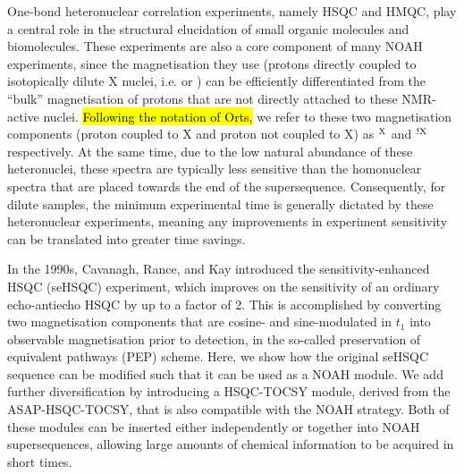 \documentclass[11pt]{article}
\newcommand*{\carbon}{\ce{^{13}C}}
\newcommand*{\nitrogen}{\ce{^{15}N}}
\newcommand*{\magn}[1]{\ce{^1H}$^{#1}$}
\newcommand*{\magnnot}[1]{\ce{^1H}$^{!#1}$}
\begin{document}
One-bond heteronuclear correlation experiments, namely HSQC and HMQC, play a central role in the structural elucidation of small organic molecules and biomolecules.\autocite{textbooks}
These experiments are also a core component of many NOAH experiments, since the magnetisation they use (protons directly coupled to isotopically dilute X nuclei, i.e. \carbon{} or \nitrogen{}) can be efficiently differentiated from the ``bulk'' magnetisation of protons that are not directly attached to these NMR-active nuclei.\autocite{Garbow1982CPL, Kupce2019JMR}
\hl{Following the notation of Orts,}\autocite{Orts2018M} we refer to these two magnetisation components (proton coupled to X and proton not coupled to X) as \magn{\ce{X}} and \magnnot{\ce{X}} respectively.
At the same time, due to the low natural abundance of these heteronuclei, these spectra are typically less sensitive than the homonuclear spectra that are placed towards the end of the supersequence.
Consequently, for dilute samples, the minimum experimental time is generally dictated by these heteronuclear experiments, meaning any improvements in experiment sensitivity can be translated into greater time savings.

In the 1990s, Cavanagh, Rance, and Kay introduced the sensitivity-enhanced HSQC (seHSQC) experiment, which improves on the sensitivity of an ordinary echo-antiecho HSQC by up to a factor of 2.\autocite{sehsqc}
This is accomplished by converting two magnetisation components that are cosine- and sine-modulated in $t_1$ into observable magnetisation prior to detection, in the so-called preservation of equivalent pathways (PEP) scheme.
Here, we show how the original seHSQC sequence can be modified such that it can be used as a NOAH module.
We add further diversification by introducing a HSQC-TOCSY module, derived from the ASAP-HSQC-TOCSY,\autocite{Becker2019JMR} that is also compatible with the NOAH strategy.
Both of these modules can be inserted either independently or together into NOAH supersequences, allowing large amounts of chemical information to be acquired in short times.


\end{document}
